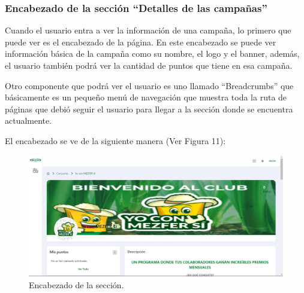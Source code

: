 \subsubsection{Encabezado de la sección ``Detalles de las campañas''}
Cuando el usuario entra a ver la información de una campaña, lo primero que puede ver es el encabezado de la página. En este encabezado se puede ver información básica de la campaña como su nombre, el logo y el banner, además, el usuario también podrá ver la cantidad de puntos que tiene en esa campaña.

Otro componente que podrá ver el usuario es uno llamado ``Breadcrumbs'' que básicamente es un pequeño menú de navegación que muestra toda la ruta de páginas que debió seguir el usuario para llegar a la sección donde se encuentra actualmente.

El encabezado se ve de la siguiente manera (Ver Figura 11):

    \begin{figure}[H]
        \begin{center}
            \includegraphics[scale=0.26]{img/actividades/detalles-campanias/encabezado.png}
            \caption{Encabezado de la sección.}
            \label{fig:encabezado}
        \end{center}
    \end{figure}